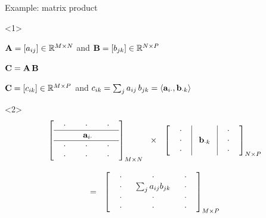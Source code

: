 \documentclass[14pt]{beamer}
\begin{document}
\begin{frame}{Example: matrix product}

\begin{onlyenv}<1>
\begin{center}
$\mathbf{A} = [a_{ij}] \in \mathbb{R}^{M\times N}$ and $\mathbf{B} = [b_{jk}] \in \mathbb{R}^{N\times P}$\bigskip\bigskip

$\mathbf{C} = \mathbf{A} \,\mathbf{B}$\bigskip\bigskip

$\mathbf{C} = [c_{ik}] \in \mathbb{R}^{M\times P}$ and $c_{ik} = \sum_j a_{ij}\,b_{jk} = \langle \mathbf{a}_{i \cdot}, \mathbf{b}_{\cdot k} \rangle$
\end{center}
\end{onlyenv}

\begin{onlyenv}<2>
\footnotesize
\[
\begin{array}{c}
\left[\begin{array}{ccc}
\ \ \cdot \ \ & \ \ \cdot \ \  & \ \ \cdot \ \ \\
\hline
& \ \mb a_{i\cdot} & \\
 \hline
\ \ \cdot \ \ & \ \ \cdot \ \  & \ \ \cdot \ \ \\
\ \ \cdot \ \ & \ \ \cdot \ \  & \ \ \cdot \ \ \\
\end{array}\right]_{M \times N} \ \ \times \ \ \left[\begin{array}{c|c|c}
\ \ \cdot \ \ &   & \ \ \cdot \ \ \\
\ \ \cdot \ \ & \ \mb b_{\cdot k} \  & \ \ \cdot \ \ \\
\ \ \cdot \ \ & & \ \ \cdot \ \ \\
\end{array}\right]_{N \times P}\\
\\
= \ \ \left[\begin{array}{ccc}
\ \ \cdot \ \ & \ \ \cdot \ \  & \ \ \cdot \ \ \\
\ \ \cdot \ \ & \sum_j a_{ij}b_{jk} & \ \ \cdot \ \ \\
\ \ \cdot \ \ & \ \ \cdot \ \  & \ \ \cdot \ \ \\
\ \ \cdot \ \ & \ \ \cdot \ \  & \ \ \cdot \ \ \\
\end{array}\right]_{M \times P}
\end{array}
\]
\end{onlyenv}


\end{frame}
\end{document}

